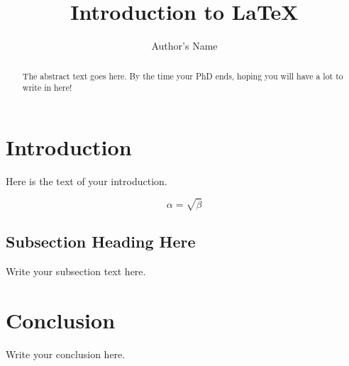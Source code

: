 \documentclass{article}
\begin{document}
\title{Introduction to \LaTeX{}}
\author{Author's Name}

\maketitle

\begin{abstract}
The abstract text goes here. By the time your PhD ends, hoping you will have a lot to write in here!
\end{abstract}

\section{Introduction}
Here is the text of your introduction.

\begin{equation}
    \label{simple_equation}
    \alpha = \sqrt{ \beta }
\end{equation}

\subsection{Subsection Heading Here}
Write your subsection text here.

\section{Conclusion}
Write your conclusion here.
\end{document}
